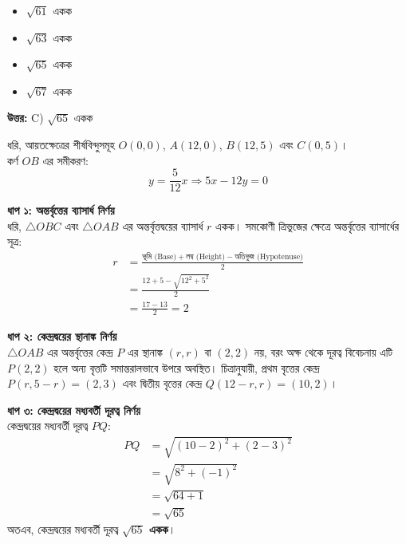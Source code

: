 \documentclass[12pt, a4paper]{article}
\begin{document}
\vspace{1em}
\begin{itemize}[label={}, leftmargin=1cm, itemsep=0.5em]
    \item[\textbf{A)}] $\sqrt{61}$ একক
    \item[\textbf{B)}] $\sqrt{63}$ একক
    \item[\textbf{C)}] $\sqrt{65}$ একক
    \item[\textbf{D)}] $\sqrt{67}$ একক
\end{itemize}

\vspace{0.5em}
\begin{tcolorbox}[answerbox]
    \textbf{\color{success} উত্তর:} C) $\sqrt{65}$ একক
\end{tcolorbox}
\vspace{1em}

\begin{tcolorbox}[solutionbox={সমাধান (Solution)}]
    \noindent
    ধরি, আয়তক্ষেত্রের শীর্ষবিন্দুসমূহ $O(0, 0)$, $A(12, 0)$, $B(12, 5)$ এবং $C(0, 5)$। \\
    কর্ণ $OB$ এর সমীকরণ: 
    \[ y = \frac{5}{12}x \Rightarrow 5x - 12y = 0 \]
    
    \vspace{0.5em}
    \noindent\textbf{ধাপ ১: অন্তর্বৃত্তের ব্যাসার্ধ নির্ণয়} \\
    ধরি, $\triangle OBC$ এবং $\triangle OAB$ এর অন্তর্বৃত্তদ্বয়ের ব্যাসার্ধ $r$ একক। সমকোণী ত্রিভুজের ক্ষেত্রে অন্তর্বৃত্তের ব্যাসার্ধের সূত্র:
    \begin{align*}
        r &= \frac{\text{ভূমি (Base)} + \text{লম্ব (Height)} - \text{অতিভুজ (Hypotenuse)}}{2} \\
          &= \frac{12 + 5 - \sqrt{12^2 + 5^2}}{2} \\
          &= \frac{17 - 13}{2} = 2
    \end{align*}
    
    \vspace{0.5em}
    \noindent\textbf{ধাপ ২: কেন্দ্রদ্বয়ের স্থানাঙ্ক নির্ণয়} \\
    $\triangle OAB$ এর অন্তর্বৃত্তের কেন্দ্র $P$ এর স্থানাঙ্ক $(r, r)$ বা $(2, 2)$ নয়, বরং অক্ষ থেকে দূরত্ব বিবেচনায় এটি $P(2, 2)$ হলে অন্য বৃত্তটি সমান্তরালভাবে উপরে অবস্থিত। চিত্রানুযায়ী, প্রথম বৃত্তের কেন্দ্র $P(r, 5-r) = (2, 3)$ এবং দ্বিতীয় বৃত্তের কেন্দ্র $Q(12-r, r) = (10, 2)$।
    
    \vspace{0.5em}
    \noindent\textbf{ধাপ ৩: কেন্দ্রদ্বয়ের মধ্যবর্তী দূরত্ব নির্ণয়} \\
    কেন্দ্রদ্বয়ের মধ্যবর্তী দূরত্ব $PQ$:
    \begin{align*}
        PQ &= \sqrt{(10 - 2)^2 + (2 - 3)^2} \\
           &= \sqrt{8^2 + (-1)^2} \\
           &= \sqrt{64 + 1} \\
           &= \sqrt{65}
    \end{align*}
    অতএব, কেন্দ্রদ্বয়ের মধ্যবর্তী দূরত্ব \textbf{$\sqrt{65}$ একক}।
\end{tcolorbox}
\end{document}
